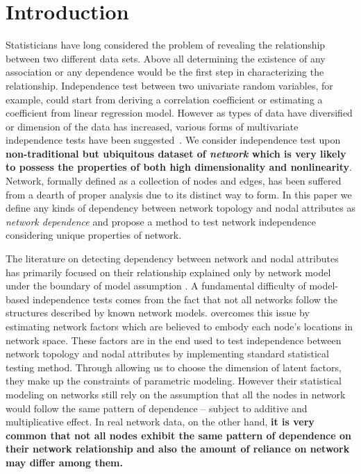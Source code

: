 \documentclass[12pt]{article}
\theoremstyle{definition}
\begin{document}
	\section{Introduction}
	\label{sec:intro}

Statisticians have long considered the problem of revealing the relationship between two different data sets. Above all determining the existence of any association or any dependence would be the first step in characterizing the relationship. Independence test between two univariate random variables, for example, could start from deriving a correlation coefficient or estimating a coefficient from linear regression model. However as types of data have diversified or dimension of the data has increased, various forms of multivariate independence tests have been suggested~\citep{heller2012consistent, szekely2007measuring}. We consider independence test upon \textbf{non-traditional but ubiquitous dataset of \textit{network} which is very likely to possess the properties of both high dimensionality and nonlinearity}. Network, formally defined as a collection of nodes and edges, has been suffered from a dearth of proper analysis due to its distinct way to form. In this paper we define any kinds of dependency between network topology and nodal attributes as \textit{network dependence} and propose a method to test network independence considering unique properties of network. 

The literature on detecting dependency between network and nodal attributes has primarily focused on their relationship explained only by network model under the boundary of model assumption \citep{wasserman1996logit, howard2016understanding, christakis2007spread, christakis2008collective}. A fundamental difficulty of model-based independence tests comes from the fact that not all networks follow the structures described by known network models. \cite{fosdick2015testing} overcomes this issue by estimating network factors which are believed to embody each node's locations in network space. These factors are in the end used to test independence between network topology and nodal attributes by implementing standard statistical testing method. Through allowing us to choose the dimension of latent factors, they make up the constraints of parametric modeling. However their statistical modeling on networks still rely on the assumption that all the nodes in network would follow the same pattern of dependence -- subject to additive and multiplicative effect. In real network data, on the other hand, \textbf{it is very common that not all nodes exhibit the same pattern of dependence on their network relationship and also the amount of reliance on network may differ among them.}
\end{document}
